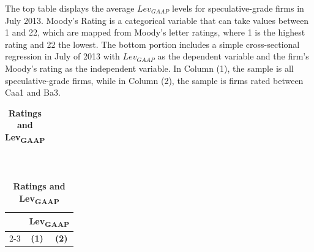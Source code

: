 \documentclass[a4paper, 12pt]{article}
\begin{document}



\clearpage

\newpage

\begin{table}[htbp]
\caption{\textbf{Ratings and Lev\textsubscript{GAAP}  }
} \label{table_ratbook}
\begin{singlespace}
\begin{small}

\noindent The top table displays the average $Lev_{GAAP}$ levels for speculative-grade firms in July 2013. Moody's Rating is a categorical variable that can take values between 1 and 22, which are mapped from Moody's letter ratings, where 1 is the highest rating and 22 the lowest. The bottom portion includes a simple cross-sectional regression in July of 2013 with $Lev_{GAAP}$ as the dependent variable and the firm's Moody's rating as the independent variable. In Column (1), the sample is all speculative-grade firms, while in Column (2), the sample is firms rated between Caa1 and Ba3.

\end{small}
\end{singlespace}
\vspace{3mm}
\small
  \centering
{
\def\sym#1{\ifmmode^{#1}\else\(^{#1}\)\fi}
\begin{tabular}{l*{3}{ccccccc}}               \\
\hline


\hline


\end{tabular}
}           \\


\begin{tabular}{lcc}
\\
    \toprule
    \textbf{} &
      \multicolumn{2}{c}{\textbf{Lev\textsubscript{GAAP}}}
      \\
          \cline{2-3}
    \textbf{} &
      \textbf{(1)} &
      \textbf{(2)}
      \\
       \midrule
    
    \bottomrule
    \end{tabular}


\end{table}
\clearpage
\newpage
\end{document}
